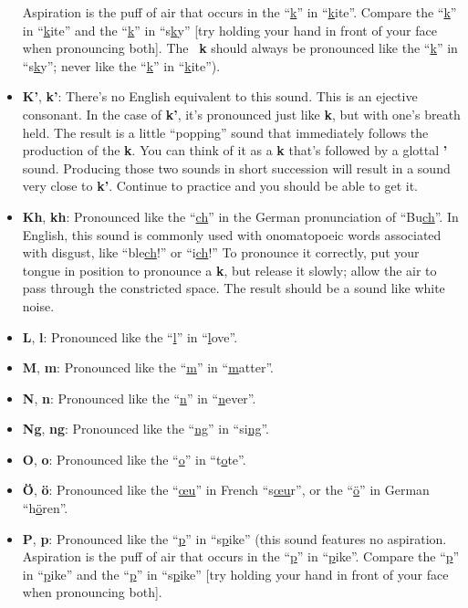 \begin{itemize}
Aspiration is the puff of air that occurs in the ``\uline{k}'' in ``\uline{k}ite''.
Compare the ``\uline{k}'' in ``\uline{k}ite'' and the ``\uline{k}'' in ``s\uline{k}y'' [try holding your hand in front of your face when pronouncing both].
The \LanguageName\ \textbf{k} should always be pronounced like the ``\uline{k}'' in ``s\uline{k}y'';
never like the ``\uline{k}'' in ``\uline{k}ite'').
\item
\textbf{K'}, \textbf{k'}:
There's no English equivalent to this sound.
This is an ejective consonant.
In the case of \textbf{k'}, it's pronounced just like \textbf{k}, but with one's breath held.
The result is a little ``popping'' sound that immediately follows the production of the \textbf{k}.
You can think of it as a \textbf{k} that's followed by a glottal \textbf{'} sound.
Producing those two sounds in short succession will result in a sound very close to \textbf{k'}.
Continue to practice and you should be able to get it.
\item
\textbf{Kh}, \textbf{kh}:
Pronounced like the ``\uline{ch}'' in the German pronunciation of ``Bu\uline{ch}''.
In English, this sound is commonly used with onomatopoeic words associated with disgust, like ``ble\uline{ch}!'' or ``i\uline{ch}!''
To pronounce it correctly, put your tongue in position to pronounce a \textbf{k}, but release it slowly;
allow the air to pass through the constricted space.
The result should be a sound like white noise.
\item
\textbf{L}, \textbf{l}:
Pronounced like the ``\uline{l}'' in ``\uline{l}ove''.
\item
\textbf{M}, \textbf{m}:
Pronounced like the ``\uline{m}'' in ``\uline{m}atter''.
\item
\textbf{N}, \textbf{n}:
Pronounced like the ``\uline{n}'' in ``\uline{n}ever''.
\item
\textbf{Ng}, \textbf{ng}:
Pronounced like the ``\uline{ng}'' in ``si\uline{ng}''.
\item
\textbf{O}, \textbf{o}:
Pronounced like the ``\uline{o}'' in ``t\uline{o}te''.
\item
\textbf{Ö}, \textbf{ö}:
Pronounced like the ``\uline{œu}'' in French ``s\uline{œu}r'', or the ``\uline{ö}'' in German ``h\uline{ö}ren''.
\item
\textbf{P}, \textbf{p}:
Pronounced like the ``\uline{p}'' in ``s\uline{p}ike'' (this sound features no aspiration.
Aspiration is the puff of air that occurs in the ``\uline{p}'' in ``\uline{p}ike''.
Compare the ``\uline{p}'' in ``\uline{p}ike'' and the ``\uline{p}'' in ``s\uline{p}ike'' [try holding your hand in front of your face when pronouncing both].

\end{itemize}
